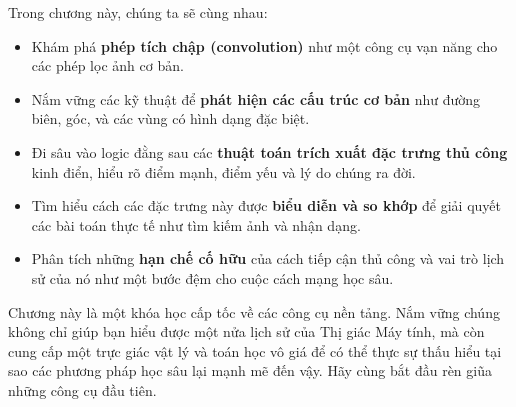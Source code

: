 Trong chương này, chúng ta sẽ cùng nhau:
\begin{itemize}
	\item Khám phá \textbf{phép tích chập (convolution)} như một công cụ vạn năng cho các phép lọc ảnh cơ bản.
	\item Nắm vững các kỹ thuật để \textbf{phát hiện các cấu trúc cơ bản} như đường biên, góc, và các vùng có hình dạng đặc biệt.
	\item Đi sâu vào logic đằng sau các \textbf{thuật toán trích xuất đặc trưng thủ công} kinh điển, hiểu rõ điểm mạnh, điểm yếu và lý do chúng ra đời.
	\item Tìm hiểu cách các đặc trưng này được \textbf{biểu diễn và so khớp} để giải quyết các bài toán thực tế như tìm kiếm ảnh và nhận dạng.
	\item Phân tích những \textbf{hạn chế cố hữu} của cách tiếp cận thủ công và vai trò lịch sử của nó như một bước đệm cho cuộc cách mạng học sâu.
\end{itemize}

Chương này là một khóa học cấp tốc về các công cụ nền tảng. Nắm vững chúng không chỉ giúp bạn hiểu được một nửa lịch sử của Thị giác Máy tính, mà còn cung cấp một trực giác vật lý và toán học vô giá để có thể thực sự thấu hiểu tại sao các phương pháp học sâu lại mạnh mẽ đến vậy. Hãy cùng bắt đầu rèn giũa những công cụ đầu tiên.
